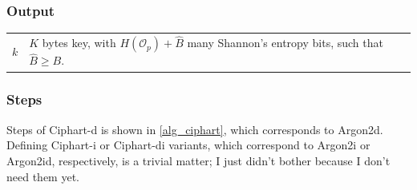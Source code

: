 \documentclass[twocolumn]{article}
\begin{document}
\subsubsection{Output}
\begin{tabularx}{\columnwidth}{lX}
$k$ & $K$ bytes key, with $H(\mathcal{O}_p) + \hat B$ many Shannon's
        entropy bits, such that $\hat B \ge B$.\\
\end{tabularx}

\subsubsection{Steps}
Steps of Ciphart-d is shown in \cref{alg_ciphart}, which corresponds
to Argon2d.  Defining Ciphart-i or Ciphart-di
variants, which correspond to Argon2i or Argon2id,
respectively, is a trivial matter; I just didn't bother because I don't
need them yet.
\end{document}
